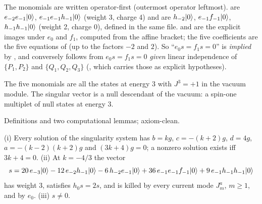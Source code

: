 \begin{dictionary}
The monomials are written operator-first (outermost operator leftmost).  are
$e_{-2}e_{-1}|0\rangle$, $e_{-1}e_{-1}h_{-1}|0\rangle$ (weight 3, charge 4) and  are
$h_{-2}|0\rangle$, $e_{-1}f_{-1}|0\rangle$, $h_{-1}h_{-1}|0\rangle$ (weight 2, charge 0), defined in the same
file.  and  are the explicit images under $e_0$ and $f_1$, computed from
the affine bracket; the five coefficients are the five equations of  (up to the
factors $-2$ and $2$). So ``$e_0s=f_1s=0$'' is \emph{implied} by , and conversely
 follows from $e_0s=f_1s=0$ \emph{given} linear independence of $\{P_1,P_2\}$ and
$\{Q_1,Q_2,Q_3\}$ (, which carries those as explicit hypotheses).
\end{dictionary}

\begin{physics}
The five monomials are all the states at energy $3$ with $J^3 = +1$ in the vacuum module. The
singular vector is a null descendant of the vacuum: a spin-one multiplet of null states at energy $3$.
\end{physics}

\begin{status}
Definitions and two computational lemmas; axiom-clean.
\end{status}

\begin{theorem}\label{l08:thm:sing43}
(i) Every solution of the singularity system has $b=kg$, $c=-(k+2)g$, $d=4g$, $a=-(k-2)(k+2)g$ and
$(3k+4)g=0$; a nonzero solution exists iff $3k+4 = 0$. (ii) At $k=-4/3$ the vector
\begin{equation*}
s = 20\,e_{-3}|0\rangle - 12\,e_{-2}h_{-1}|0\rangle - 6\,h_{-2}e_{-1}|0\rangle + 36\,e_{-1}e_{-1}f_{-1}|0\rangle
+ 9\,e_{-1}h_{-1}h_{-1}|0\rangle
\end{equation*}
has weight $3$, satisfies $h_0s=2s$, and is killed by every current mode $J^a_m$, $m\ge1$, and by $e_0$.
(iii) $s\ne0$.
\end{theorem}

